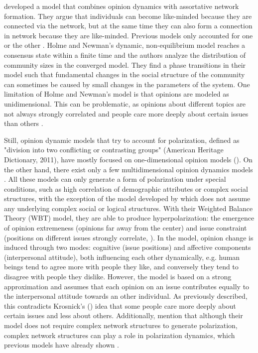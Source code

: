 \documentclass[11pt]{article}
\begin{document}
\citet{holme2006nonequilibrium} developed a model that combines opinion dynamics with assortative network formation. They argue that individuals can become like-minded because they are connected via the network, but at the same time they can also form a connection in network because they are like-minded. Previous models only accounted for one or the other \citep{castellano2003incomplete,deffuant2002can,liggett2012interacting,castellano2000nonequilibrium,mcpherson2001birds,sood2005voter,sznajd2000opinion}. Holme and Newman's dynamic, non-equilibrium model reaches a consensus state within a finite time and the authors analyze the distribution of community sizes in the converged model. They find a phase transitions in their model such that fundamental changes in the social structure of the community can sometimes be caused by small changes in the parameters of the system.
One limitation of Holme and Newman's model is that opinions are modeled as unidimensional. This can be problematic, as opinions about different topics are not always strongly correlated and people care more deeply about certain issues than others \citep{krosnick1990}. 

Still, opinion dynamic models that try to account for polarization, defined as "division into two conflicting or contrasting groups" (American Heritage Dictionary, 2011), have mostly focused on one-dimensional opinion models (\citep{lorenz2007,flache2017,jager2005,salzarulo2006}). On the other hand, there exist only a few multidimensional opinion dynamics models \citep{huet2010,flache2008,flache2011,schweighofer2020}. All these models can only generate a form of polarization under special conditions, such as high correlation of demographic attributes or complex social structures, with the exception of the model developed by \citet{schweighofer2020} which does not assume any underlying complex social or logical structures. With their Weighted Balance Theory (WBT) model, they are able to produce hyperpolarization: the emergence of opinion extremeness (opinions far away from the center) and issue constraint (positions on different issues strongly correlate, \citep{converse1964}). In the model, opinion change is induced through two modes: cognitive (issue positions) and affective components (interpersonal attitude), both influencing each other dynamically, e.g. human beings tend to agree more with people they like, and conversely they tend to disagree with people they dislike. However, the model is based on a strong approximation and assumes that each opinion on an issue contributes equally to the interpersonal attitude towards an other individual. As previously described, this contradicts Krosnick's (\citeyear{krosnick1990}) idea that some people care more deeply about certain issues and less about others. Additionally, \citet{schweighofer2020} mention that although their model does not require complex network structures to generate polarization, complex network structures can play a role in polarization dynamics, which previous models have already shown \citep{deffuant2013,Manzo2015,Hofstede2018}.
\end{document}
